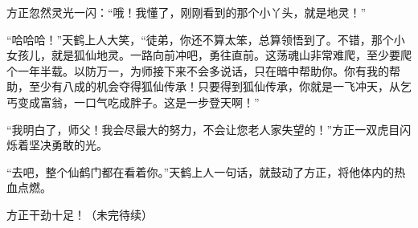 \begin{this_body}
方正忽然灵光一闪：“哦！我懂了，刚刚看到的那个小丫头，就是地灵！”

“哈哈哈！”天鹤上人大笑，“徒弟，你还不算太笨，总算领悟到了。不错，那个小女孩儿，就是狐仙地灵。一路向前冲吧，勇往直前。这荡魂山非常难爬，至少要爬个一年半载。以防万一，为师接下来不会多说话，只在暗中帮助你。你有我的帮助，至少有八成的机会夺得狐仙传承！只要得到狐仙传承，你就是一飞冲天，从乞丐变成富翁，一口气吃成胖子。这是一步登天啊！”

“我明白了，师父！我会尽最大的努力，不会让您老人家失望的！”方正一双虎目闪烁着坚决勇敢的光。

“去吧，整个仙鹤门都在看着你。”天鹤上人一句话，就鼓动了方正，将他体内的热血点燃。

方正干劲十足！（未完待续）

\end{this_body}

